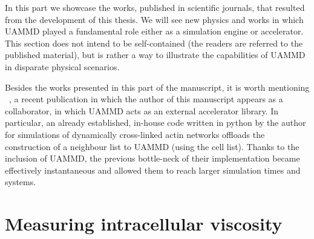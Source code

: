 \documentclass[twoside,openright,titlepage,numbers=noenddot,%
headinclude,footinclude,cleardoublepage=empty,abstract=on,
BCOR=5mm,fontsize=11pt, dvipsnames, paper=b5
]{scrreprt}
\newcommand{\uammd}{\gls{UAMMD}\xspace}
\begin{document}
In this part we showcase the works, published in scientific journals, that resulted from the development of this thesis. We will see new physics and works in which \uammd played a fundamental role either as a simulation engine or accelerator.
This section does not intend to be self-contained (the readers are referred to the published material), but is rather a way to illustrate the capabilities of UAMMD in disparate physical scenarios.

Besides the works presented in this part of the manuscript, it is worth mentioning ~\cite{Maxian2021Fibers}, a recent publication in which the author of this manuscript appears as a collaborator, in which UAMMD acts as an external accelerator library. In particular, an already established, in-house code written in python by the author for simulations of dynamically cross-linked actin networks offloads the construction of a neighbour list to UAMMD (using the cell list). Thanks to the inclusion of UAMMD, the previous bottle-neck of their implementation became effectively instantaneous and allowed them to reach larger simulation times and systems.

\chapter{Measuring intracellular viscosity}
\end{document}

